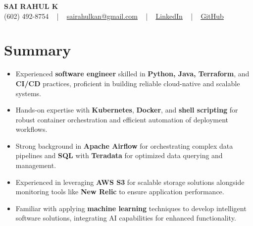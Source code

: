\documentclass[letterpaper,11pt]{article}
\newcommand{\resumeItem}[1]{
  \item\footnotesize{
    {#1 \vspace{-2pt}}
  }
}
\newcommand{\resumeItemListStart}{\begin{itemize}[leftmargin=*]}
\newcommand{\resumeItemListEnd}{\end{itemize}\vspace{-5pt}}
\begin{document}
\begin{center}
    {\fontsize{14pt}{12pt}\selectfont \textbf{\MakeUppercase{Sai Rahul K}}}\\ \vspace{2pt}
    \fontsize{10pt}{12pt}\selectfont (602) 492-8754 ~ | ~ \href{mailto:sairahulkan@gmail.com}{sairahulkan@gmail.com} ~ | ~
    \href{https://www.linkedin.com/in/rq123/}{\color{blue}\underline{LinkedIn}} ~ | ~
    \href{https://github.com/kanrahuldo}{\color{blue}\underline{GitHub}}~
    \vspace{-8pt}
\end{center}

\section{Summary}
\fontsize{9pt}{10pt}\selectfont
\resumeItemListStart
    \resumeItem{Experienced \textbf{software engineer} skilled in \textbf{Python, Java, Terraform}, and \textbf{CI/CD} practices, proficient in building reliable cloud-native and scalable systems.} \vspace{-3pt}
    \resumeItem{Hands-on expertise with \textbf{Kubernetes}, \textbf{Docker}, and \textbf{shell scripting} for robust container orchestration and efficient automation of deployment workflows.} \vspace{-3pt}
    \resumeItem{Strong background in \textbf{Apache Airflow} for orchestrating complex data pipelines and \textbf{SQL} with \textbf{Teradata} for optimized data querying and management.} \vspace{-3pt}
    \resumeItem{Experienced in leveraging \textbf{AWS S3} for scalable storage solutions alongside monitoring tools like \textbf{New Relic} to ensure application performance.} \vspace{-3pt}
    \resumeItem{Familiar with applying \textbf{machine learning} techniques to develop intelligent software solutions, integrating AI capabilities for enhanced functionality.} \vspace{-3pt}
\resumeItemListEnd
\vspace{-6pt}
\end{document}
